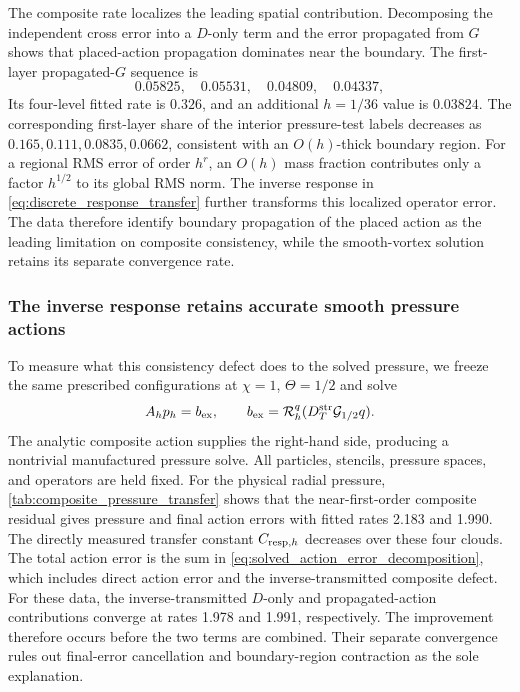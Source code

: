 \documentclass[11pt]{article}
\theoremstyle{plain}
\theoremstyle{definition}
\theoremstyle{remark}
\newcommand{\Th}{\Theta}
\begin{document}
The composite rate localizes the leading spatial contribution.  Decomposing
the independent cross error into a $D$-only term and the error propagated from
$G$ shows that placed-action propagation dominates near the boundary.  The
first-layer propagated-$G$ sequence is
\begin{equation}
  0.05825,\quad0.05531,\quad0.04809,\quad0.04337,
  \label{eq:test2_boundary_G_sequence}
\end{equation}
Its four-level fitted rate is $0.326$, and an additional $h=1/36$ value is
$0.03824$.  The corresponding first-layer share of the interior
pressure-test labels decreases as $0.165,0.111,0.0835,0.0662$, consistent with
an $O(h)$-thick boundary region.  For a regional RMS error of
order $h^r$, an $O(h)$ mass fraction contributes only a factor $h^{1/2}$
to its global RMS norm.  The inverse response in
\eqref{eq:discrete_response_transfer} further transforms this localized
operator error.  The data therefore identify boundary propagation of the
placed action as the leading limitation on composite consistency, while the
smooth-vortex solution retains its separate convergence rate.

\subsubsection{The inverse response retains accurate smooth pressure actions}

To measure what this consistency defect does to the solved pressure, we
freeze the same prescribed configurations at $\chi=1$, $\Th=1/2$ and solve
\begin{equation}
 A_hp_h=b_{\rm ex},\qquad
 b_{\rm ex}=\mathcal R_h^q(D_T^{\rm str}\mathcal G_{1/2}q).
 \label{eq:manufactured_composite_solve}
\end{equation}
The analytic composite action supplies the right-hand side, producing a
nontrivial manufactured pressure solve.  All particles, stencils, pressure
spaces, and operators are held fixed.  For the physical
radial pressure, \cref{tab:composite_pressure_transfer} shows that the
near-first-order composite residual gives pressure and final action errors
with fitted rates 2.183 and 1.990.  The directly measured transfer constant
$C_{{\rm resp},h}$ decreases over these four clouds.  The total action error is
the sum in \eqref{eq:solved_action_error_decomposition}, which includes direct
action error and the inverse-transmitted composite defect.  For these data,
the inverse-transmitted $D$-only and propagated-action contributions converge
at rates 1.978 and 1.991, respectively.  The improvement therefore occurs before
the two terms are combined.  Their separate convergence rules out final-error
cancellation and boundary-region contraction as the sole explanation.
\end{document}
